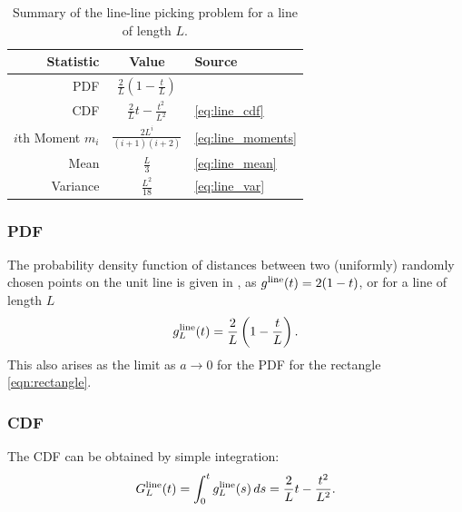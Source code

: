 \begin{table}[ht]
  \centering
  \begin{tabular}{|r|c|l|}
    \hline
    Statistic & Value & Source \\ 
    \hline
      PDF                & $\displaystyle \frac{2}{L} \left( 1-\frac{t}{L} \right)$ &
                             \cite{weisstein:_line_line_picking,b.ghosh51:_random_rect} \\
      CDF                & $\displaystyle \frac{2}{L} t - \frac{t^2}{L^2}$ & 
                             \eqref{eq:line_cdf}\\
      $i$th Moment $m_i$ & $\displaystyle \frac{2 L^{i}}{(i+1)(i+2)}$ &
                             \eqref{eq:line_moments} \\
      Mean               & $\displaystyle \frac{L}{3}$ &
                             \eqref{eq:line_mean} \\
      Variance           & $\displaystyle \frac{L^2}{18}$ &
                             \eqref{eq:line_var} \\[1.5ex]
    \hline
  \end{tabular}
  \caption{Summary of the line-line picking problem for a line of
    length $L$.}
  \label{tab:summary_line}
\end{table}

\subsubsection{PDF}

The probability density function of distances between two (uniformly)
randomly chosen points on the unit line is given in
\cite{weisstein:_line_line_picking,b.ghosh51:_random_rect}, as
$g^{\rm line}(t) = 2(1-t)$, or for a line of length $L$
\begin{equation}
  \label{eq:line_line}
  g^{\rm line}_L(t) = \frac{2}{L} \left( 1-\frac{t}{L} \right).
\end{equation}
This also arises as the limit as $a \rightarrow 0$ for the PDF for the
rectangle \eqref{eqn:rectangle}. 

\subsubsection{CDF}

The CDF can be obtained by simple integration:
\begin{equation}
  \label{eq:line_cdf}
    G^{\rm line}_L(t)
 = \int_0^t g^{\rm line}_L(s) \, ds
 =  \frac{2}{L} t - \frac{t^2}{L^2}. 
\end{equation}

